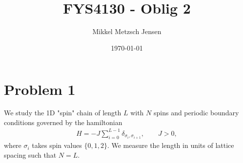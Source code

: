 \documentclass[reprint, amsmath, amssymb, aps, onecolumn]{revtex4-2}
\begin{document}
\title{FYS4130 - Oblig 2}

\author{Mikkel Metzsch Jensen}
\noaffiliation
\date{\today}
\maketitle
%
\onecolumngrid

\section*{Problem 1}
\noindent We study the 1D "spin" chain of length $L$ with $N$ spins and periodic boundary conditions governed by the hamiltonian
\begin{align*}
  H = -J \sum_{i=0}^{L-1} \delta_{\sigma_i, \sigma_{i+1}}, \qquad J > 0,
\end{align*}
where $\sigma_i$ takes spin values $\{0,1,2\}$. We measure the length in units of lattice spacing such that $N=L$. 
%
%
\end{document}
